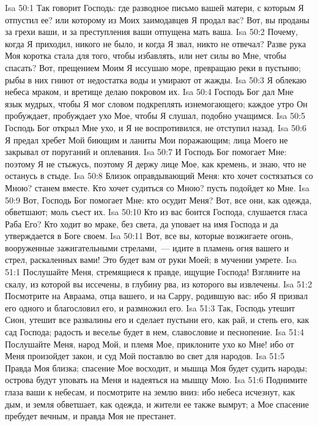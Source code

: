 \vs Isa 50:1 Так говорит Господь: где разводное письмо вашей матери, с которым Я отпустил ее? или которому из Моих заимодавцев Я продал вас? Вот, вы проданы за грехи ваши, и за преступления ваши отпущена мать ваша.
\vs Isa 50:2 Почему, когда Я приходил, никого не было, и когда Я звал, никто не отвечал? Разве рука Моя коротка стала для того, чтобы избавлять, или нет силы во Мне, чтобы спасать? Вот, прещением Моим Я иссушаю море, превращаю реки в пустыню; рыбы в них гниют от недостатка воды и умирают от жажды.
\vs Isa 50:3 Я облекаю небеса мраком, и вретище делаю покровом их.
\vs Isa 50:4 Господь Бог дал Мне язык мудрых, чтобы Я мог словом подкреплять изнемогающего; каждое утро Он пробуждает, пробуждает ухо Мое, чтобы Я слушал, подобно учащимся.
\vs Isa 50:5 Господь Бог открыл Мне ухо, и Я не воспротивился, не отступил назад.
\vs Isa 50:6 Я предал хребет Мой биющим и ланиты Мои поражающим; лица Моего не закрывал от поруганий и оплевания.
\vs Isa 50:7 И Господь Бог помогает Мне: поэтому Я не стыжусь, поэтому Я держу лице Мое, как кремень, и знаю, что не останусь в стыде.
\vs Isa 50:8 Близок оправдывающий Меня: кто хочет состязаться со Мною? станем вместе. Кто хочет судиться со Мною? пусть подойдет ко Мне.
\vs Isa 50:9 Вот, Господь Бог помогает Мне: кто осудит Меня? Вот, все они, как одежда, обветшают; моль съест их.
\vs Isa 50:10 Кто из вас боится Господа, слушается гласа Раба Его? Кто ходит во мраке, без света, да уповает на имя Господа и да утверждается в Боге своем.
\vs Isa 50:11 Вот, все вы, которые возжигаете огонь, вооруженные зажигательными стрелами,~--- идите в пламень огня вашего и стрел, раскаленных вами! Это будет вам от руки Моей; в мучении умрете.
\vs Isa 51:1 Послушайте Меня, стремящиеся к правде, ищущие Господа! Взгляните на скалу, из которой вы иссечены, в глубину рва, из которого вы извлечены.
\vs Isa 51:2 Посмотрите на Авраама, отца вашего, и на Сарру, родившую вас: ибо Я призвал его одного и благословил его, и размножил его.
\vs Isa 51:3 Так, Господь утешит Сион, утешит все развалины его и сделает пустыни его, как рай, и степь его, как сад Господа; радость и веселье будет в нем, славословие и песнопение.
\vs Isa 51:4 Послушайте Меня, народ Мой, и племя Мое, приклоните ухо ко Мне! ибо от Меня произойдет закон, и суд Мой поставлю во свет для народов.
\vs Isa 51:5 Правда Моя близка; спасение Мое восходит, и мышца Моя будет судить народы; острова будут уповать на Меня и надеяться на мышцу Мою.
\vs Isa 51:6 Поднимите глаза ваши к небесам, и посмотрите на землю вниз: ибо небеса исчезнут, как дым, и земля обветшает, как одежда, и жители ее также вымрут; а Мое спасение пребудет вечным, и правда Моя не престанет.
